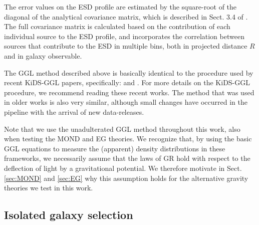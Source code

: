 \documentclass[usenatbib]{mnras}
\begin{document}
The error values on the ESD profile are estimated by the square-root of the diagonal of the analytical covariance matrix, which is described in Sect. 3.4 of \cite{viola2015}. The full covariance matrix is calculated based on the contribution of each individual source to the ESD profile, and incorporates the correlation between sources that contribute to the ESD in multiple bins, both in projected distance $R$ and in galaxy observable.

The GGL method described above is basically identical to the procedure used by recent KiDS-GGL papers, specifically: \cite{dvornik2017,dvornik2018} and \cite{brouwer2017,brouwer2018}. For more details on the KiDS-GGL procedure, we recommend reading these recent works. The method that was used in older works \cite[]{viola2015,sifon2015,uitert2016,brouwer2016} is also very similar, although small changes have occurred in the pipeline with the arrival of new data-releases.

Note that we use the unadulterated GGL method throughout this work, also when testing the MOND and EG theories. We recognize that, by using the basic GGL equations to measure the (apparent) density distributions in these frameworks, we necessarily assume that the laws of GR hold with respect to the deflection of light by a gravitational potential. We therefore motivate in Sect. \ref{sec:MOND} and \ref{sec:EG} why this assumption holds for the alternative gravity theories we test in this work.


\subsection{Isolated galaxy selection}
\label{sec:isolation}
\end{document}
